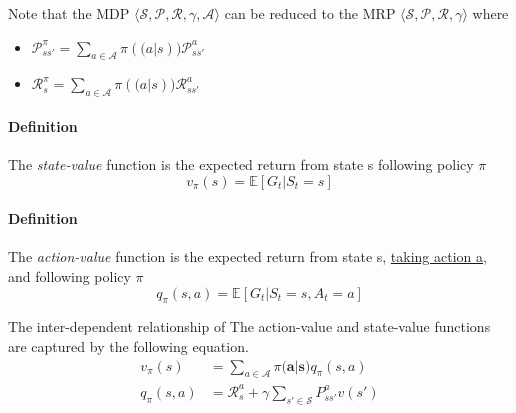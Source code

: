 	Note that the MDP $\langle \mathcal{S, P, R, \gamma, A} \rangle$ can be reduced to the MRP $ \langle \mathcal{S, P, R, \gamma} \rangle$ where
	\begin{itemize}
	\centering
	\item $\mathcal{P}^{\pi}_{ss'} = \sum_{a \in \mathcal{A}} \pi(\mathbf(a|s))\mathcal{P}^a_{ss'}$
	\item $\mathcal{R}^{\pi}_s = \sum_{a \in \mathcal{A}} \pi(\mathbf(a|s))\mathcal{R}^a_{ss'}$
	\end{itemize}


	\paragraph{Definition} The \textit{state-value} function is the expected return from state s following policy $\pi$
	\begin{equation*}
	v_\pi(s) = \mathbb{E}[G_t|S_t = s]
	\end{equation*}

	\paragraph{Definition} The \textit{action-value} function is the expected return from state s, \underline{taking action a}, and following policy $\pi$
	\begin{equation*}
	q_\pi(s,a) = \mathbb{E}[G_t|S_t = s, A_t = a]
	\end{equation*}

	The inter-dependent relationship of The action-value and state-value functions are captured by the following equation.
	\begin{align*}
	v_\pi(s) &= \sum_{a \in \mathcal{A}}  \pi(\mathbf{a|s)}q_\pi(s,a) \\
	q_\pi(s,a) &= \mathcal{R}^a_s + \gamma \sum_{s' \in \mathcal{S}} P^a_{ss'}v(s') 
	\end{align*}

